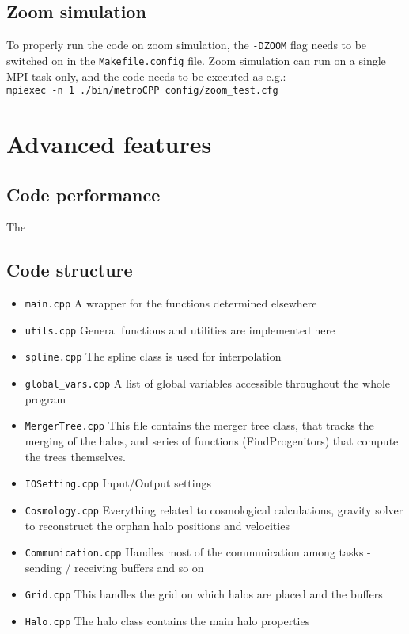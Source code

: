 \documentclass{article}
\begin{document}
\subsection{Zoom simulation}
To properly run the code on zoom simulation, the \texttt{-DZOOM} flag needs to be switched on in the \texttt{Makefile.config} file.
Zoom simulation can run on a single MPI task only, and the code needs to be executed as e.g.:\\

\texttt{mpiexec -n 1 ./bin/metroCPP config/zoom\_test.cfg}


\section{Advanced features}

\subsection{Code performance}

\label{sec:advanced}

The 


\subsection{Code structure}

\begin{itemize}
\item{\texttt{main.cpp}} A wrapper for the functions determined elsewhere
\item{\texttt{utils.cpp}} General functions and utilities are implemented here
\item{\texttt{spline.cpp}} The spline class is used for interpolation 
\item{\texttt{global\_vars.cpp}} A list of global variables accessible throughout the whole program
\item{\texttt{MergerTree.cpp}} This file contains the merger tree class, that tracks the merging of the halos, 
and series of functions (FindProgenitors) that compute the trees themselves.
\item{\texttt{IOSetting.cpp}} Input/Output settings
\item{\texttt{Cosmology.cpp}} Everything related to cosmological calculations, gravity solver to reconstruct the orphan halo 
positions and velocities 
\item{\texttt{Communication.cpp}} Handles most of the communication among tasks - sending / receiving buffers and so on
\item{\texttt{Grid.cpp}} This handles the grid on which halos are placed and the buffers
\item{\texttt{Halo.cpp}} The halo class contains the main halo properties
\end{itemize}
\end{document}
